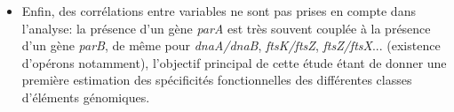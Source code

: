 \begin{itemize}
\item Enfin, des corrélations entre variables ne sont pas prises en compte dans l'analyse: la présence d'un gène \textit{parA} est très souvent couplée à la présence d'un gène \textit{parB}, de même pour \textit{dnaA/dnaB}, \textit{ftsK/ftsZ}, \textit{ftsZ/ftsX}... (existence d'opérons notamment), l'objectif principal de cette étude étant de donner une première estimation des spécificités fonctionnelles des différentes classes d'éléments génomiques.
 \end{itemize} 


